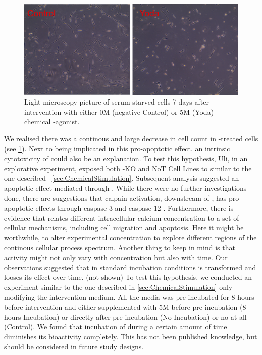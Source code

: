 \begin{figure}
	\centering
	\includegraphics[width = \linewidth]{Yoda_Apoptosis.png}
	\caption{Light microscopy picture of serum-starved cells 7 days after intervention with either 0\textmu{}M (negative Control) or 5\textmu{}M (Yoda) chemical \Piezo{}-agonist.}
	\label{pic:Yoda_Apop}
\end{figure}

We realised there was a continous and large decrease in cell count in \Yoda{}-treated cells (see \ref{pic:Yoda_Apop}). Next to \Piezo{} being implicated in this pro-apoptotic effect, an intrinsic cytotoxicity of \Yoda{} could also be an explanation. To test this hypothesis, Uli, in an explorative experiment, exposed both \Piezo{}-KO and NoT Cell Lines to \Yoda{} similar to the one described ~\vref{sec:ChemicalStimulation}. Subsequent analysis suggested an apoptotic effect mediated through \Piezo{}. While there were no further investigations done, there are suggestions that calpain activation, downstream of \Piezo{}, has pro-apoptotic effects through caspase-3 and caspase-12 \cite{Nakagawa2000, Altznauer2004}. Furthermore, there is evidence that relates different intracellular calcium concentration to a set of cellular mechanisms, including cell migration and apoptosis. Here it might be worthwhile, to alter experimental \Yoda{} concentration to explore different regions of the continous cellular process spectrum. Another thing to keep in mind is that \Yoda{} activity might not only vary with concentration but also with time.
Our observations suggested that in standard incubation conditions \Yoda{} is transformed and looses its effect over time. (not shown) To test this hypothesis, we conducted an experiment similar to the one described in \ref{sec:ChemicalStimulation} only modifying the intervention medium. All the media was pre-incubated for 8 hours before intervention and either supplemented with 5\textmu{}M \Yoda{} before pre-incubation (8 hours Incubation) or directly after pre-incubation (No Incubation) or no \Yoda{} at all (Control). We found that incubation of \Yoda{} during a certain amount of time diminishes its bioactivity completely. This has not been published knowledge, but should be considered in future study designs. 




